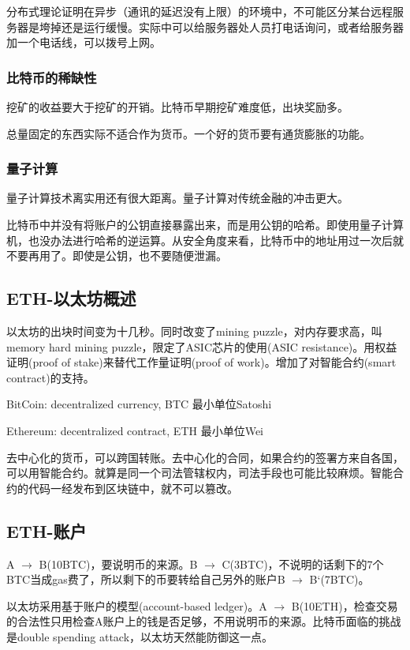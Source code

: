 \documentclass[10pt]{ctexart}
\begin{document}
分布式理论证明在异步（通讯的延迟没有上限）的环境中，不可能区分某台远程服务器是垮掉还是运行缓慢。实际中可以给服务器处人员打电话询问，或者给服务器加一个电话线，可以拨号上网。

\subsubsection{比特币的稀缺性}
挖矿的收益要大于挖矿的开销。比特币早期挖矿难度低，出块奖励多。

总量固定的东西实际不适合作为货币。一个好的货币要有通货膨胀的功能。

\subsubsection{量子计算}
量子计算技术离实用还有很大距离。量子计算对传统金融的冲击更大。

比特币中并没有将账户的公钥直接暴露出来，而是用公钥的哈希。即使用量子计算机，也没办法进行哈希的逆运算。从安全角度来看，比特币中的地址用过一次后就不要再用了。即使是公钥，也不要随便泄漏。

\subsection{ETH-以太坊概述}
以太坊的出块时间变为十几秒。同时改变了mining puzzle，对内存要求高，叫memory hard mining puzzle，限定了ASIC芯片的使用(ASIC resistance)。用权益证明(proof of stake)来替代工作量证明(proof of work)。增加了对智能合约(smart contract)的支持。

BitCoin: decentralized currency, BTC 最小单位Satoshi

Ethereum: decentralized contract, ETH 最小单位Wei

去中心化的货币，可以跨国转账。去中心化的合同，如果合约的签署方来自各国，可以用智能合约。就算是同一个司法管辖权内，司法手段也可能比较麻烦。智能合约的代码一经发布到区块链中，就不可以篡改。

\subsection{ETH-账户}
A $\rightarrow$ B(10BTC)，要说明币的来源。B $\rightarrow$ C(3BTC)，不说明的话剩下的7个BTC当成gas费了，所以剩下的币要转给自己另外的账户B $\rightarrow$ B‘(7BTC)。

以太坊采用基于账户的模型(account-based ledger)。A $\rightarrow$ B(10ETH)，检查交易的合法性只用检查A账户上的钱是否足够，不用说明币的来源。比特币面临的挑战是double spending attack，以太坊天然能防御这一点。
\end{document}
